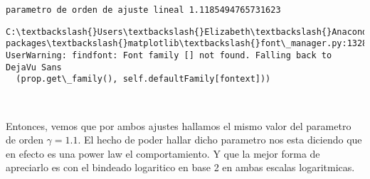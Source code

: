 \documentclass[11pt]{article}
\begin{document}
    \begin{Verbatim}[commandchars=\\\{\}]
parametro de orden de ajuste lineal 1.1185494765731623

    \end{Verbatim}

    \begin{Verbatim}[commandchars=\\\{\}]
C:\textbackslash{}Users\textbackslash{}Elizabeth\textbackslash{}Anaconda3\textbackslash{}lib\textbackslash{}site-packages\textbackslash{}matplotlib\textbackslash{}font\_manager.py:1328: UserWarning: findfont: Font family [] not found. Falling back to DejaVu Sans
  (prop.get\_family(), self.defaultFamily[fontext]))

    \end{Verbatim}

    \begin{center}
    \end{center}
    { \hspace*{\fill} \\}
    
    Entonces, vemos que por ambos ajustes hallamos el mismo valor del
parametro de orden \(\gamma = 1.1\). El hecho de poder hallar dicho
parametro nos esta diciendo que en efecto es una power law el
comportamiento. Y que la mejor forma de apreciarlo es con el bindeado
logaritico en base 2 en ambas escalas logaritmicas.


    
    
    
    
\end{document}
